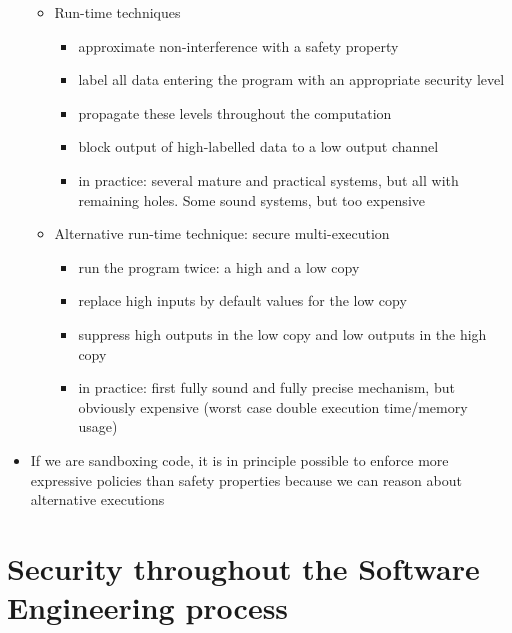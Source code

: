 \documentclass[12pt,titlepage,a4paper]{report}
\begin{document}
\begin{itemize}
\begin{itemize}
			\item Run-time techniques
			\begin{itemize}
				\item approximate non-interference with a safety property
				\item label all data entering the program with an appropriate security level
				\item propagate these levels throughout the computation
				\item block output of high-labelled data to a low output channel
				\item in practice: several mature and practical systems, but all with remaining holes. Some sound systems, but too expensive
			\end{itemize}
			\item Alternative run-time technique: secure multi-execution
			\begin{itemize}
				\item run the program twice: a high and a low copy
				\item replace high inputs by default values for the low copy
				\item suppress high outputs in the low copy and low outputs in the high copy
				\item in practice: first fully sound and fully precise mechanism, but obviously expensive (worst case double execution time/memory usage)
			\end{itemize}
		\end{itemize}
		\item If we are sandboxing code, it is in principle possible to enforce more expressive policies than safety properties because we can reason about alternative executions
	\end{itemize}

	\chapter{Security throughout the Software Engineering process}
\end{document}
